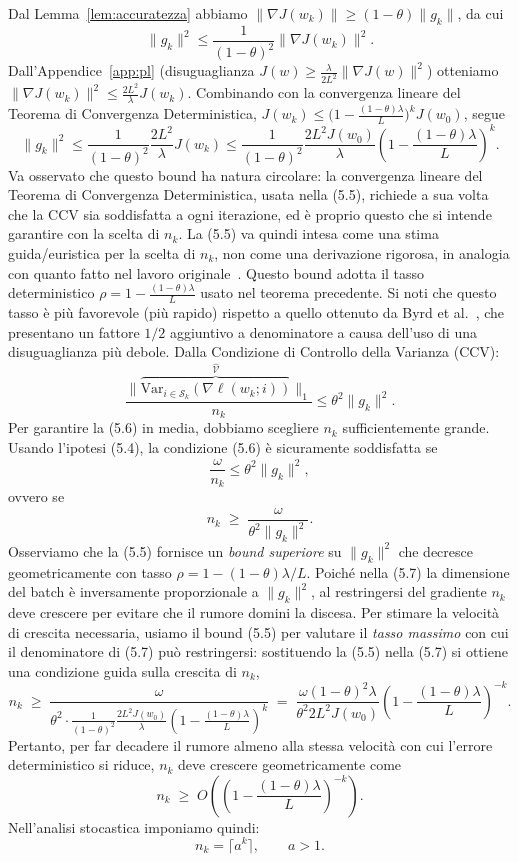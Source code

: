 \documentclass[a4paper,12pt]{article}
\numberwithin{equation}{section}
\numberwithin{figure}{section}
\numberwithin{table}{section}
\begin{document}
Dal Lemma~\ref{lem:accuratezza} abbiamo $\|\nabla J(w_k)\|\ge(1-\theta)\|g_k\|$,
da cui
\[
\|g_k\|^2\le\frac{1}{(1-\theta)^2}\|\nabla J(w_k)\|^2.
\]
Dall'Appendice~\ref{app:pl} (disuguaglianza $J(w)\ge\frac{\lambda}{2L^2}\|\nabla J(w)\|^2$)
otteniamo $\|\nabla J(w_k)\|^2\le\frac{2L^2}{\lambda}J(w_k)$.
Combinando con la convergenza lineare del Teorema di Convergenza Deterministica,
$J(w_k)\le\bigl(1-\frac{(1-\theta)\lambda}{L}\bigr)^k J(w_0)$, segue
\[
\|g_k\|^2\le\frac{1}{(1-\theta)^2}\frac{2L^2}{\lambda}J(w_k)
\le\frac{1}{(1-\theta)^2}\frac{2L^2 J(w_0)}{\lambda}
\left(1-\frac{(1-\theta)\lambda}{L}\right)^k.
\tag{5.5}\label{eq:bound_gk}
\]
Va osservato che questo bound ha natura circolare: la convergenza lineare del Teorema di Convergenza Deterministica, usata nella (5.5), richiede a sua volta che la CCV sia soddisfatta a ogni iterazione, ed è proprio questo che si intende garantire con la scelta di $n_k$. La (5.5) va quindi intesa come una stima guida/euristica per la scelta di $n_k$, non come una derivazione rigorosa, in analogia con quanto fatto nel lavoro originale~\cite{byrd2012}.
Questo bound adotta il tasso deterministico $\rho=1-\frac{(1-\theta)\lambda}{L}$ usato nel teorema precedente.  Si noti che questo tasso è più favorevole (più rapido) rispetto a quello ottenuto da Byrd et al.~\cite{byrd2012}, che presentano un fattore $1/2$ aggiuntivo a denominatore a causa dell'uso di una disuguaglianza più debole.
Dalla Condizione di Controllo della Varianza (CCV):
\[
\frac{\|\overbrace{\mathrm{Var}_{i\in\mathcal{S}_k}(\nabla \ell(w_k;i))}^{\widehat{\mathcal{V}}}\|_1}{n_k} \le \theta^2 \|g_k\|^2. \tag{5.6}\]
Per garantire la (5.6) in media, dobbiamo scegliere \(n_k\) sufficientemente grande. Usando l'ipotesi (5.4), la condizione (5.6) è sicuramente soddisfatta se
\[
\frac{\omega}{n_k} \le \theta^2 \|g_k\|^2,
\]
ovvero se
\[
n_k \;\ge\; \frac{\omega}{\theta^2 \|g_k\|^2}. \tag{5.7}
\]
Osserviamo che la (5.5) fornisce un \emph{bound superiore} su \(\|g_k\|^2\) che decresce geometricamente con tasso \(\rho = 1-(1-\theta)\lambda/L\). Poiché nella (5.7) la dimensione del batch è inversamente proporzionale a \(\|g_k\|^2\), al restringersi del gradiente \(n_k\) deve crescere per evitare che il rumore domini la discesa. Per stimare la velocità di crescita necessaria, usiamo il bound (5.5) per valutare il \emph{tasso massimo} con cui il denominatore di (5.7) può restringersi: sostituendo la (5.5) nella (5.7) si ottiene una condizione guida sulla crescita di \(n_k\),
\[
n_k \;\ge\; \frac{\omega}{\theta^2 \cdot \frac{1}{(1-\theta)^2}\frac{2L^2 J(w_0)}{\lambda}\left(1 - \frac{(1-\theta)\lambda}{L}\right)^k}
\;=\; \frac{\omega (1-\theta)^2 \lambda}{\theta^2 2L^2 J(w_0)}
\left(1 - \frac{(1-\theta)\lambda}{L}\right)^{-k}. \tag{5.8}
\]
Pertanto, per far decadere il rumore almeno alla stessa velocità con cui l'errore deterministico si riduce, \(n_k\) deve crescere geometricamente come
\[
n_k \;\ge\; O\!\left(\left(1 - \frac{(1-\theta)\lambda}{L}\right)^{-k}\right).
\]
Nell'analisi stocastica imponiamo quindi:
\[
n_k = \lceil a^k \rceil, \qquad a > 1. \tag{5.9}
\]
\end{document}
